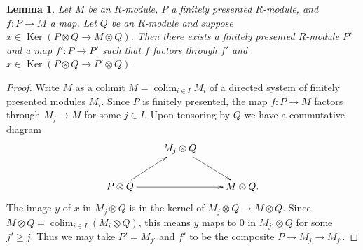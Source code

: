 \documentclass[10pt,a4paper]{amsart}
\theoremstyle{plain}
\newtheorem{lemma}[subsection]{Lemma}
\theoremstyle{definition}
\theoremstyle{remark}
\numberwithin{equation}{subsection}
\def\colim{\mathop{\mathrm{colim}}\nolimits}
\def\Ker{\mathop{\mathrm{Ker}}}
\begin{document}
\begin{lemma}
\label{lemma-kernel-tensored-fp}
Let $M$ be an $R$-module, $P$ a finitely presented $R$-module, and $f: P
\to M$ a map.  Let $Q$ be an $R$-module and suppose $x \in \Ker(P
\otimes Q \to M \otimes Q)$.  Then there exists a finitely presented
$R$-module $P'$ and a map $f': P \to P'$ such that $f$ factors through
$f'$ and $x \in \Ker(P \otimes Q \to P' \otimes Q)$.
\end{lemma}

\begin{proof}
Write $M$ as a colimit $M = \colim_{i \in I} M_i$ of a directed system of
finitely presented modules $M_i$.  Since $P$ is finitely presented, the map $f:
P \to M$ factors through $M_j \to M$ for some $j \in I$.  Upon
tensoring by $Q$ we have a commutative diagram
$$
\xymatrix{
& M_j \otimes Q \ar[dr] & \\
P \otimes Q \ar[ur] \ar[rr] & & M \otimes Q .
}
$$
The image $y$ of $x$ in $M_j \otimes Q$ is in the kernel of $M_j \otimes Q
\to M \otimes Q$.  Since $M \otimes Q = \colim_{i \in I} (M_i
\otimes
Q)$, this means $y$ maps to $0$ in $M_{j'} \otimes Q$ for some $j' \geq j$.
Thus we may take $P' = M_{j'}$ and $f'$ to be the composite $P \to M_j
\to M_{j'}$.
\end{proof}
\end{document}
